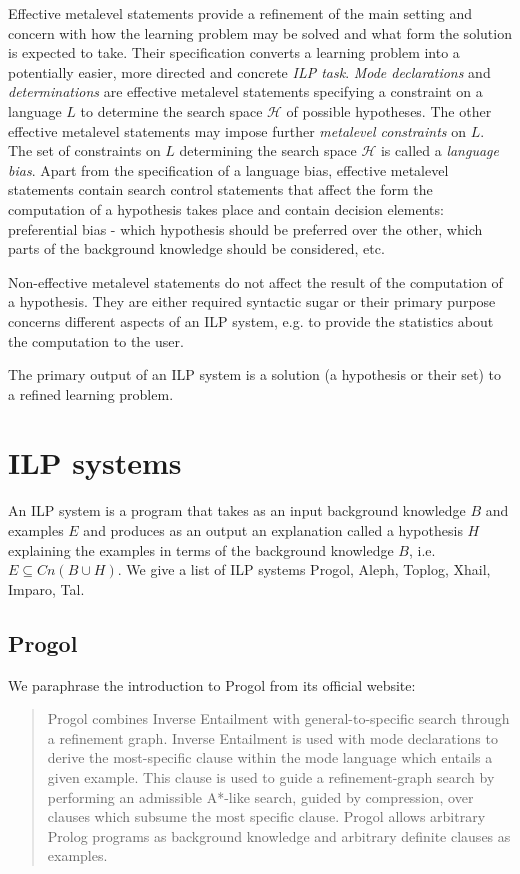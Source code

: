 Effective metalevel statements provide a refinement of the main setting and concern with how the learning problem may be solved and what form the solution is expected to take. Their specification converts a learning problem into a potentially easier, more directed and concrete \emph{ILP task}.
\emph{Mode declarations} and \emph{determinations} are effective metalevel statements specifying a constraint on a language $L$ to determine the search space $\mathcal{H}$ of possible hypotheses. The other effective metalevel statements may impose further \emph{metalevel constraints} on $L$. The set of constraints on $L$ determining the search space $\mathcal{H}$ is called a \emph{language bias}.
Apart from the specification of a language bias, effective metalevel statements contain search control statements that affect the form the computation of a hypothesis takes place and contain decision elements: preferential bias - which hypothesis should be preferred over the other, which parts of the background knowledge should be considered, etc.

Non-effective metalevel statements do not affect the result of the computation of a hypothesis. They are either required syntactic sugar or their primary purpose concerns different aspects of an ILP system, e.g. to provide the statistics about the computation to the user.

The primary output of an ILP system is a solution (a hypothesis or their set) to a refined learning problem.

\section{ILP systems}
An ILP system is a program that takes as an input background knowledge $B$ and examples $E$ and produces as an output an explanation called a hypothesis $H$ explaining the examples in terms of the background knowledge $B$, i.e. $E \subseteq Cn(B \cup H)$.
We give a list of ILP systems Progol, Aleph, Toplog, Xhail, Imparo, Tal.

\subsection{Progol}
We paraphrase the introduction to Progol from its official website\cite{muggleton1999progolWebsite}:
\begin{quote}
Progol combines Inverse Entailment with general-to-specific search through a refinement graph. Inverse Entailment is used with mode declarations to derive the most-specific clause within the mode language which entails a given example. This clause is used to guide a refinement-graph search by performing an admissible A*-like search, guided by compression, over clauses which subsume the most specific clause. Progol allows arbitrary Prolog programs as background knowledge and arbitrary definite clauses as examples.
\end{quote}

